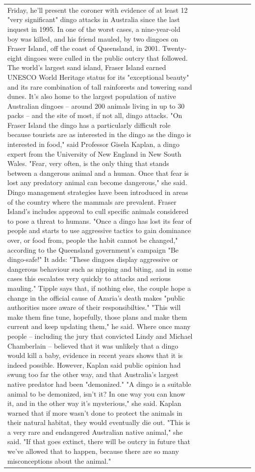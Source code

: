 \begin{table}[H]
\begin{tabular}{lllrlllll}
Friday, he'll present the coroner with evidence of at least 12 "very significant" dingo attacks in Australia since the last inquest in 1995. In one of the worst cases, a nine-year-old boy was killed, and his friend mauled, by two dingoes on Fraser Island, off the coast of Queensland, in 2001. Twenty-eight dingoes were culled in the public outcry that followed. The world's largest sand island, Fraser Island earned UNESCO World Heritage status for its "exceptional beauty" and its rare combination of tall rainforests and towering sand dunes. It's also home to the largest population of native Australian dingoes -- around 200 animals living in up to 30 packs -- and the site of most, if not all, dingo attacks. "On Fraser Island the dingo has a particularly difficult role because tourists are as interested in the dingo as the dingo is interested in food," said Professor Gisela Kaplan, a dingo expert from the University of New England in New South Wales. "Fear, very often, is the only thing that stands between a dangerous animal and a human. Once that fear is lost any predatory animal can become dangerous," she said. Dingo management strategies have been introduced in areas of the country where the mammals are prevalent. Fraser Island's includes approval to cull specific animals considered to pose a threat to humans. "Once a dingo has lost its fear of people and starts to use aggressive tactics to gain dominance over, or food from, people the habit cannot be changed," according to the Queensland government's campaign "Be dingo-safe!" It adds: "These dingoes display aggressive or dangerous behaviour such as nipping and biting, and in some cases this escalates very quickly to attacks and serious mauling." Tipple says that, if nothing else, the couple hope a change in the official cause of Azaria's death makes "public authorities more aware of their responsibilties." "This will make them fine tune, hopefully, those plans and make them current and keep updating them," he said. Where once many people -- including the jury that convicted Lindy and Michael Chamberlain -- believed that it was unlikely that a dingo would kill a baby, evidence in recent years shows that it is indeed possible. However, Kaplan said public opinion had swung too far the other way, and that Australia's largest native predator had been "demonized." "A dingo is a suitable animal to be demonized, isn't it? In one way you can know it, and in the other way it's mysterious," she said. Kaplan warned that if more wasn't done to protect the animals in their natural habitat, they would eventually die out. "This is a very rare and endangered Australian native animal," she said. "If that goes extinct, there will be outcry in future that we've allowed that to happen, because there are so many misconceptions about the animal."

\end{tabular}
\end{table}
